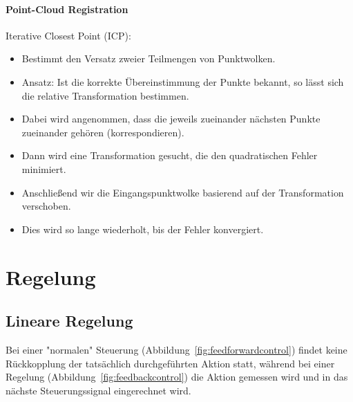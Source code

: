 			\subsubsection{Point-Cloud Registration}
				Iterative Closest Point (ICP):
				\begin{itemize}
					\item Bestimmt den Versatz zweier Teilmengen von Punktwolken.
					\item Ansatz: Ist die korrekte Übereinstimmung der Punkte bekannt, so lässt sich die relative Transformation bestimmen.
					\item Dabei wird angenommen, dass die jeweils zueinander nächsten Punkte zueinander gehören (korrespondieren).
					\item Dann wird eine Transformation gesucht, die den quadratischen Fehler minimiert.
					\item Anschließend wir die Eingangspunktwolke basierend auf der Transformation verschoben.
					\item Dies wird so lange wiederholt, bis der Fehler konvergiert.
				\end{itemize}

\chapter{Regelung} %
	\section{Lineare Regelung}
		Bei einer "normalen" Steuerung (Abbildung~\ref{fig:feedforwardcontrol}) findet keine Rückkopplung der tatsächlich durchgeführten Aktion statt, während bei einer Regelung (Abbildung~\ref{fig:feedbackcontrol}) die Aktion gemessen wird und in das nächste Steuerungssignal eingerechnet wird.
		
